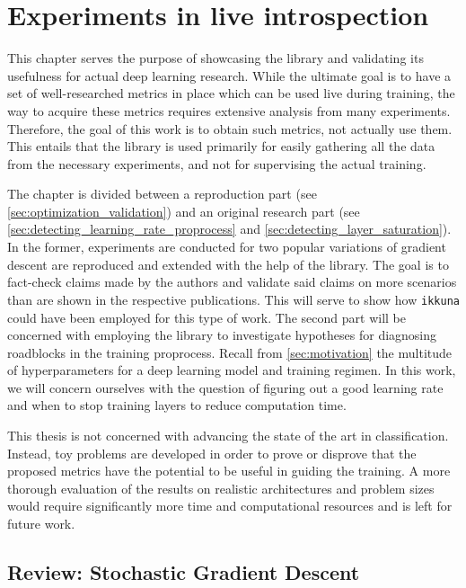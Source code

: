 \chapter{Experiments in live introspection}

This chapter serves the purpose of showcasing the library and validating its
usefulness for actual deep learning research. While the ultimate goal is to have
a set of well-researched metrics in place which can be used live during
training, the way to acquire these metrics requires extensive analysis from many
experiments. Therefore, the goal of this work is to obtain such metrics, not
actually use them. This entails that the library is used primarily for easily
gathering all the data from the necessary experiments, and not for supervising
the actual training.

The chapter is divided between a reproduction part (see
\cref{sec:optimization_validation}) and an original research part (see
\cref{sec:detecting_learning_rate_proprocess} and
\cref{sec:detecting_layer_saturation}). In the former, experiments are conducted
for two popular variations of gradient descent are reproduced and extended with
the help of the library. The goal is to fact-check claims made by the authors
and validate said claims on more scenarios than are shown in the respective
publications. This will serve to show how \texttt{ikkuna} could have been
employed for this type of work. The second part will be concerned with employing
the library to investigate hypotheses for diagnosing roadblocks in the training
proprocess. Recall from \cref{sec:motivation} the multitude of hyperparameters
for a deep learning model and training regimen. In this work, we will concern
ourselves with the question of figuring out a good learning rate and when to
stop training layers to reduce computation time.

This thesis is not concerned with advancing the state of the art in
classification. Instead, toy problems are developed in order to prove or
disprove that the proposed metrics have the potential to be useful in guiding
the training. A more thorough evaluation of the results on realistic
architectures and problem sizes would require significantly more time and
computational resources and is left for future work.

\section{Review: Stochastic Gradient Descent}%
\label{sec:review_stochastic_gradient_descent}

